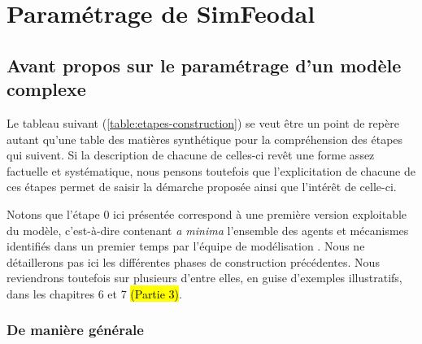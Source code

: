 \clearpage
\section{Paramétrage de SimFeodal}
	
\subsection{Avant propos sur le paramétrage d'un modèle complexe}
	
\medbreak
	

Le tableau suivant (\cref{table:etapes-construction}) se veut être un point de repère autant qu'une table des matières synthétique pour la compréhension des étapes qui suivent. Si la description de chacune de celles-ci revêt une forme assez factuelle et systématique, nous pensons toutefois que l'explicitation de chacune de ces étapes permet de saisir la démarche proposée ainsi que l'intérêt de celle-ci.

Notons que l'étape 0 ici présentée correspond à une première version \og exploitable\fg{} du modèle, c'est-à-dire contenant \textit{a minima} l'ensemble des agents et mécanismes identifiés dans un premier temps par l'équipe de modélisation \autocite{tannier_ontologie_2014}. Nous ne détaillerons pas ici les différentes phases de construction précédentes. Nous reviendrons toutefois sur plusieurs d'entre elles, en guise d'exemples illustratifs, dans les chapitres 6 et 7 \hl{(Partie 3)}.

\subsubsection{De manière générale}
	
